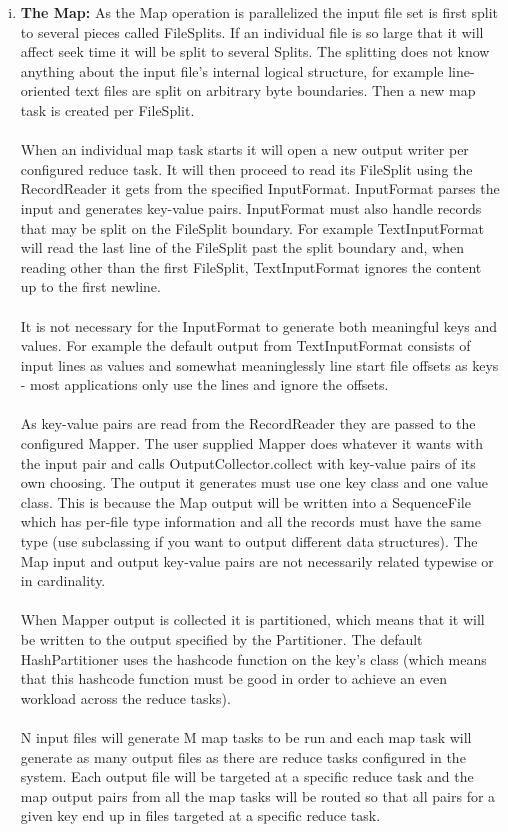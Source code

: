 \documentclass[a4paper,12pt,oneside]{report}
\begin{document}
\begin{enumerate}[(i)]
        \item \textbf{The Map:}
                As the Map operation is parallelized the input file set is first split to several pieces called FileSplits. If an individual file is so large that it will affect seek time it will be split to several Splits. The splitting does not know anything about the input file's internal logical structure, for example line-oriented text files are split on arbitrary byte boundaries. Then a new map task is created per FileSplit.\\ 
                \\
                When an individual map task starts it will open a new output writer per configured reduce task. It will then proceed to read its FileSplit using the RecordReader it gets from the specified InputFormat. InputFormat parses the input and generates key-value pairs. InputFormat must also handle records that may be split on the FileSplit boundary. For example TextInputFormat will read the last line of the FileSplit past the split boundary and, when reading other than the first FileSplit, TextInputFormat ignores the content up to the first newline.\\ 
                \\
                It is not necessary for the InputFormat to generate both meaningful keys and values. For example the default output from TextInputFormat consists of input lines as values and somewhat meaninglessly line start file offsets as keys - most applications only use the lines and ignore the offsets.\\
                \\
                As key-value pairs are read from the RecordReader they are passed to the configured Mapper. The user supplied Mapper does whatever it wants with the input pair and calls OutputCollector.collect with key-value pairs of its own choosing. The output it generates must use one key class and one value class. This is because the Map output will be written into a SequenceFile which has per-file type information and all the records must have the same type (use subclassing if you want to output different data structures). The Map input and output key-value pairs are not necessarily related typewise or in cardinality.\\ 
                \\
                When Mapper output is collected it is partitioned, which means that it will be written to the output specified by the Partitioner. The default HashPartitioner uses the hashcode function on the key's class (which means that this hashcode function must be good in order to achieve an even workload across the reduce tasks).\\ 
                \\
                N input files will generate M map tasks to be run and each map task will generate as many output files as there are reduce tasks configured in the system. Each output file will be targeted at a specific reduce task and the map output pairs from all the map tasks will be routed so that all pairs for a given key end up in files targeted at a specific reduce task.


\end{enumerate}
\end{document}
